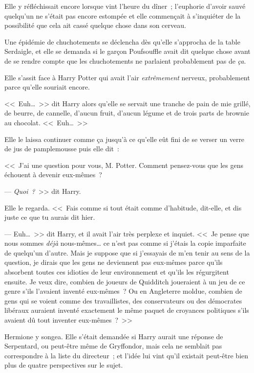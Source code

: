 \later

Elle y réfléchissait encore lorsque vint l'heure du dîner~; l'euphorie d'avoir sauvé quelqu'un ne s'était pas encore estompée et elle commençait à s'inquiéter de la possibilité que cela ait cassé quelque chose dans son cerveau.

Une épidémie de chuchotements se déclencha dès qu'elle s'approcha de la table Serdaigle, et elle se demanda si le garçon Poufsouffle avait dit quelque chose avant de se rendre compte que les chuchotements ne parlaient probablement pas de \emph{ça}.

Elle s'assit face à Harry Potter qui avait l'air \emph{extrêmement} nerveux, probablement parce qu'elle souriait encore.

<<~Euh…~>> dit Harry alors qu'elle se servait une tranche de pain de mie grillé, de beurre, de cannelle, d'aucun fruit, d'aucun légume et de trois parts de brownie au chocolat. <<~Euh…~>>

Elle le laissa continuer comme ça jusqu'à ce qu'elle eût fini de se verser un verre de jus de pamplemousse puis elle dit~:

<<~J'ai une question pour vous, M. Potter. Comment pensez-vous que les gens échouent à devenir eux-mêmes~?

--- \emph{Quoi~?}~>> dit Harry.

Elle le regarda. <<~Fais comme si tout était comme d'habitude, dit-elle, et dis juste ce que tu aurais dit hier.

--- Euh…~>> dit Harry, et il avait l'air très perplexe et inquiet. <<~Je pense que nous sommes \emph{déjà} nous-mêmes… ce n'est pas comme si j'étais la copie imparfaite de quelqu'un d'autre. Mais je suppose que si j'essayais de m'en tenir au sens de la question, je dirais que les gens ne deviennent pas eux-mêmes parce qu'ils absorbent toutes ces idioties de leur environnement et qu'ils les régurgitent ensuite. Je veux dire, combien de joueurs de Quidditch joueraient à un jeu de ce genre s'ils l'avaient inventé eux-mêmes~? Ou en Angleterre moldue, combien de gens qui se voient comme des travaillistes, des conservateurs ou des démocrates libéraux auraient inventé exactement le même paquet de croyances politiques s'ils avaient dû tout inventer eux-mêmes~?~>>

Hermione y songea. Elle s'était demandée si Harry aurait une réponse de Serpentard, ou peut-être même de Gryffondor, mais cela ne semblait pas correspondre à la liste du directeur~; et l'idée lui vint qu'il existait peut-être bien plus de quatre perspectives sur le sujet.

